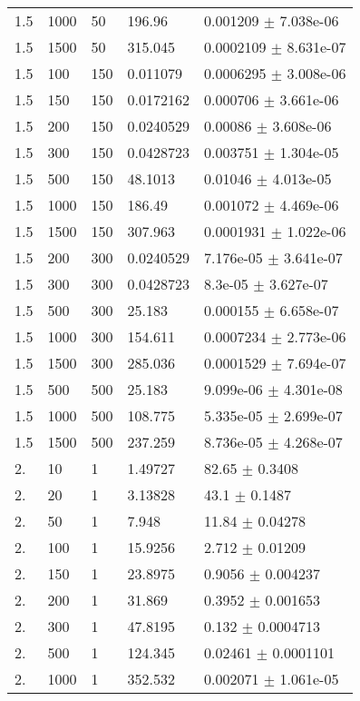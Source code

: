 \begin{longtable}{lllll}
 1.5 &  1000 &    50 &   196.96 & 0.001209 $\pm$ 7.038e-06 \\
 1.5 &  1500 &    50 &  315.045 & 0.0002109 $\pm$ 8.631e-07 \\
 1.5 &   100 &   150 & 0.011079 & 0.0006295 $\pm$ 3.008e-06 \\
 1.5 &   150 &   150 & 0.0172162 & 0.000706 $\pm$ 3.661e-06 \\
 1.5 &   200 &   150 & 0.0240529 &  0.00086 $\pm$ 3.608e-06 \\
 1.5 &   300 &   150 & 0.0428723 & 0.003751 $\pm$ 1.304e-05 \\
 1.5 &   500 &   150 &  48.1013 &  0.01046 $\pm$ 4.013e-05 \\
 1.5 &  1000 &   150 &   186.49 & 0.001072 $\pm$ 4.469e-06 \\
 1.5 &  1500 &   150 &  307.963 & 0.0001931 $\pm$ 1.022e-06 \\
 1.5 &   200 &   300 & 0.0240529 & 7.176e-05 $\pm$ 3.641e-07 \\
 1.5 &   300 &   300 & 0.0428723 &  8.3e-05 $\pm$ 3.627e-07 \\
 1.5 &   500 &   300 &   25.183 & 0.000155 $\pm$ 6.658e-07 \\
 1.5 &  1000 &   300 &  154.611 & 0.0007234 $\pm$ 2.773e-06 \\
 1.5 &  1500 &   300 &  285.036 & 0.0001529 $\pm$ 7.694e-07 \\
 1.5 &   500 &   500 &   25.183 & 9.099e-06 $\pm$ 4.301e-08 \\
 1.5 &  1000 &   500 &  108.775 & 5.335e-05 $\pm$ 2.699e-07 \\
 1.5 &  1500 &   500 &  237.259 & 8.736e-05 $\pm$ 4.268e-07 \\
  2. &    10 &     1 &  1.49727 &    82.65 $\pm$   0.3408 \\
  2. &    20 &     1 &  3.13828 &     43.1 $\pm$   0.1487 \\
  2. &    50 &     1 &    7.948 &    11.84 $\pm$  0.04278 \\
  2. &   100 &     1 &  15.9256 &    2.712 $\pm$  0.01209 \\
  2. &   150 &     1 &  23.8975 &   0.9056 $\pm$ 0.004237 \\
  2. &   200 &     1 &   31.869 &   0.3952 $\pm$ 0.001653 \\
  2. &   300 &     1 &  47.8195 &    0.132 $\pm$ 0.0004713 \\
  2. &   500 &     1 &  124.345 &  0.02461 $\pm$ 0.0001101 \\
  2. &  1000 &     1 &  352.532 & 0.002071 $\pm$ 1.061e-05 \\

\end{longtable}
